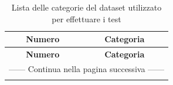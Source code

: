 \begin{center}
\begin{longtable}{|c|l|}
\caption{Lista delle categorie del dataset utilizzato per effettuare i test}
\label{lista categorie} \\

\hline \multicolumn{1}{|c|}{\textbf{Numero}} &\multicolumn{1}{c|}{\textbf{Categoria}} \\ \hline\endfirsthead

\hline \multicolumn{1}{|c|}{\textbf{Numero}} & \multicolumn{1}{c|}{\textbf{Categoria}} \\ \hline \endhead

\hline \multicolumn{2}{|c|}{{------ Continua nella pagina successiva ------}} \\ \hline
\endfoot

\hline \hline
\endlastfoot


\end{longtable}
\end{center}
